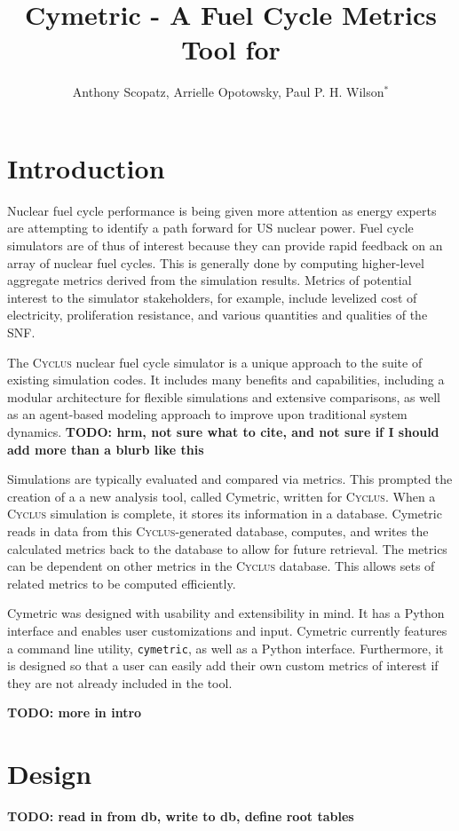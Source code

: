 \documentclass{anstrans}
\title{Cymetric - A Fuel Cycle Metrics Tool for \cyclus}
\author{Anthony Scopatz, Arrielle Opotowsky, Paul P. H. Wilson$^{*}$}
\institute{
$^{*}$Department of Engineering Physics, University of Wisconsin - Madison, 
1500 Engineering Drive, Madison WI 53703
}
\newcommand{\cyclus}{\textsc{Cyclus}\xspace}
\newcommand{\TODO}[1] {{\color{red}\textbf{TODO: #1}}}
\newcommand{\code}[1]{{\color{code}\texttt{#1}}}
\begin{document}
\section{Introduction}
Nuclear fuel cycle performance is being given more attention as energy 
experts are attempting to identify a path forward for \gls{US} nuclear power. 
Fuel cycle simulators are of thus of interest because they can provide rapid 
feedback on an array of nuclear fuel cycles. This is generally done by 
computing higher-level aggregate metrics derived from the simulation results. 
Metrics of potential interest to the simulator stakeholders, for example, 
include levelized cost of electricity, proliferation resistance, and various 
quantities and qualities of the \gls{SNF}.

The \cyclus nuclear fuel cycle simulator is a unique approach to the suite of 
existing simulation codes. It includes many benefits and capabilities, 
including a modular architecture for flexible simulations and extensive 
comparisons, as well as an agent-based modeling approach to improve upon 
traditional system dynamics. 
\TODO{hrm, not sure what to cite, and not sure if I should add more than a blurb like this}

Simulations are typically evaluated and compared via metrics. This 
prompted the creation of a
a new analysis tool, called Cymetric, written for \cyclus. When a \cyclus 
simulation is complete, it stores its information in a database. Cymetric 
reads in data from this \cyclus{}-generated database, computes, and writes 
the calculated metrics back to the database to allow for future retrieval. 
The metrics can be dependent on other metrics in the \cyclus database.
This allows sets of related metrics to be computed efficiently.

Cymetric was designed with usability and extensibility in mind. 
It has a Python interface and enables user customizations and input. 
Cymetric currently features a command line utility, \code{cymetric}, 
as well as a Python interface. Furthermore, it is designed so that a user can 
easily add their own custom metrics of interest if they are not already 
included in the tool. 

\TODO{more in intro}

\section{Design}
\TODO{ read in from db, write to db, define root tables}
\end{document}
